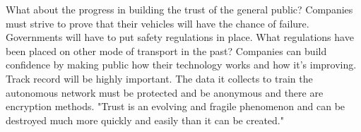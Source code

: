 \documentclass{article}
\begin{document}
What about the progress in building the trust of the general public? Companies must strive to prove that their vehicles will have the chance of failure. Governments will have to put safety regulations in place. What regulations have been placed on other mode of transport in the past? Companies can build confidence by making public how their technology works and how it’s improving. Track record will be highly important. The data it collects to train the autonomous network must be protected and be anonymous and there are encryption methods. "Trust is an
evolving and fragile phenomenon and can be destroyed much more quickly and easily than it can be created." \cite{hengstler2016applied}

\printbibliography
\end{document}
